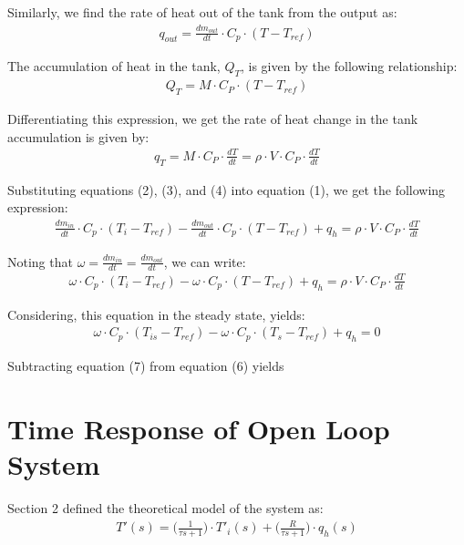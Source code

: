 \documentclass{article}
\begin{document}
Similarly, we find the rate of heat out of the tank from the output as:
\begin{align}
q_{out} = \frac{dm_{out}}{dt} \cdot C_p \cdot (T - T_{ref})
\end{align}

The accumulation of heat in the tank, $Q_T$, is given by the following relationship:
\begin{align*}
Q_{T} = M \cdot C_P \cdot (T - T_{ref})
\end{align*}

Differentiating this expression, we get the rate of heat change in the tank accumulation is given by:
\begin{align}
q_{T} = M \cdot C_P \cdot \frac{dT}{dt} = \rho \cdot V \cdot C_P \cdot \frac{dT}{dt}
\end{align}

Substituting equations (2), (3), and (4) into equation (1), we get the following expression:
\begin{align*}
\frac{dm_{in}}{dt} \cdot C_p \cdot (T_i - T_{ref}) - \frac{dm_{out}}{dt} \cdot C_p \cdot (T - T_{ref}) + q_h = \rho \cdot V \cdot C_P \cdot \frac{dT}{dt}
\end{align*}

Noting that $\omega = \frac{dm_{in}}{dt} = \frac{dm_{out}}{dt}$, we can write:
\begin{align}
\omega \cdot C_p \cdot (T_i - T_{ref}) - \omega \cdot C_p \cdot (T - T_{ref}) + q_h = \rho \cdot V \cdot C_P \cdot \frac{dT}{dt}
\end{align}

Considering, this equation in the steady state, yields:
\begin{align}
\omega \cdot C_p \cdot (T_{is} - T_{ref}) - \omega \cdot C_p \cdot (T_s - T_{ref}) + q_h = 0
\end{align}

Subtracting equation (7) from equation (6) yields

\section{Time Response of Open Loop System}
Section 2 defined the theoretical model of the system as:
\begin{align*}
T'(s) = \bigg(\frac{1}{\tau s + 1}\bigg) \cdot T'_i(s) + \bigg(\frac{R}{\tau s + 1}\bigg) \cdot q_h(s)
\end{align*}
\end{document}
